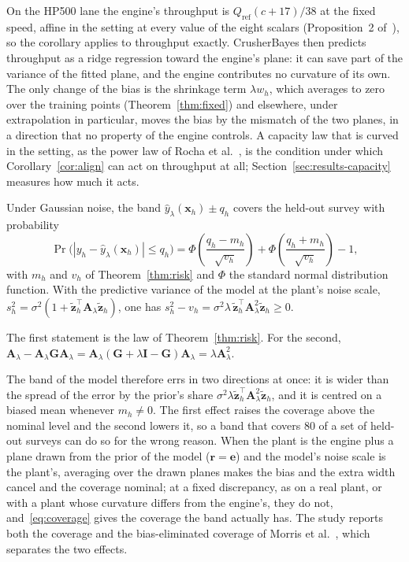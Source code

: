 On the HP500 lane the engine's throughput is $Q_{\mathrm{ref}}(c+17)/38$ at the fixed speed, affine in the setting at every
value of the eight scalars (Proposition~2 of~\cite{cb002}), so the corollary applies to throughput exactly. CrusherBayes then
predicts throughput as a ridge regression toward the engine's plane: it can save part of the variance of the fitted plane,
and the engine contributes no curvature of its own. The only change of the bias is the shrinkage term $\lambda w_h$, which
averages to zero over the training points (Theorem~\ref{thm:fixed}) and elsewhere, under extrapolation in particular, moves
the bias by the mismatch of the two planes, in a direction that no property of the engine controls. A capacity law that is curved in the
setting, as the power law of Rocha et al.~\cite{rocha}, is the condition under which Corollary~\ref{cor:align} can act on
throughput at all; Section~\ref{sec:results-capacity} measures how much it acts.

\begin{corollary}\label{cor:coverage}
Under Gaussian noise, the band $\hat y_\lambda(\mathbf x_h)\pm q_h$ covers the held-out survey with probability
\begin{equation}
\Pr\big(|y_h-\hat y_\lambda(\mathbf x_h)|\le q_h\big)=\Phi\!\left(\frac{q_h-m_h}{\sqrt{v_h}}\right)+\Phi\!\left(\frac{q_h+m_h}{\sqrt{v_h}}\right)-1,
\label{eq:coverage}
\end{equation}
with $m_h$ and $v_h$ of Theorem~\ref{thm:risk} and $\Phi$ the standard normal distribution function. With the predictive
variance of the model at the plant's noise scale, $s_h^2=\sigma^2(1+\tilde{\mathbf z}_h^{\top}\mathbf A_\lambda\tilde{\mathbf
z}_h)$, one has $s_h^2-v_h=\sigma^2\lambda\,\tilde{\mathbf z}_h^{\top}\mathbf A_\lambda^2\tilde{\mathbf z}_h\ge0$.
\end{corollary}
\begin{IEEEproof}
The first statement is the law of Theorem~\ref{thm:risk}. For the second, $\mathbf A_\lambda-\mathbf A_\lambda\mathbf G\mathbf
A_\lambda=\mathbf A_\lambda(\mathbf G+\lambda\mathbf I-\mathbf G)\mathbf A_\lambda=\lambda\mathbf A_\lambda^2$.
\end{IEEEproof}

The band of the model therefore errs in two directions at once: it is wider than the spread of the error by the prior's
share $\sigma^2\lambda\tilde{\mathbf z}_h^{\top}\mathbf A_\lambda^2\tilde{\mathbf z}_h$, and it is centred on a biased mean
whenever $m_h\ne0$. The first effect raises the coverage above the nominal level and the second lowers it, so a band that
covers 80\pct{} of a set of held-out surveys can do so for the wrong reason. When the plant is the engine plus a plane drawn
from the prior of the model ($\mathbf r=\mathbf e$) and the model's noise scale is the plant's, averaging over the drawn
planes makes the bias and the extra width cancel and the coverage nominal; at a fixed discrepancy, as on a real plant, or with
a plant whose curvature differs from the engine's, they do not, and~\eqref{eq:coverage} gives the coverage the band actually has. The study reports both the coverage and the
bias-eliminated coverage of Morris et al.~\cite{morris}, which separates the two effects.

